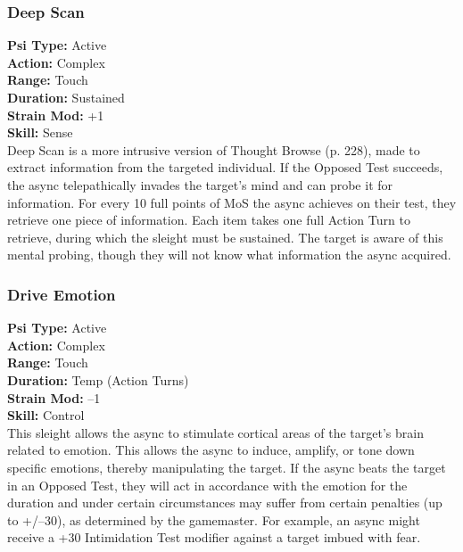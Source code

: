 \subsubsection{Deep Scan}
\textbf{Psi Type:} Active \\ 
\textbf{Action:} Complex \\ 
\textbf{Range:} Touch \\ 
\textbf{Duration:} Sustained \\
\textbf{Strain Mod:} +1 \\ 
\textbf{Skill:} Sense\\
Deep Scan is a more intrusive version of Thought
Browse (p. 228), made to extract information from the
targeted individual. If the Opposed Test succeeds, the
async telepathically invades the target’s mind and can
probe it for information. For every 10 full points of MoS
the async achieves on their test, they retrieve one piece
of information. Each item takes one full Action Turn to
retrieve, during which the sleight must be sustained. The
target is aware of this mental probing, though they will
not know what information the async acquired.

\subsubsection{Drive Emotion}
\textbf{Psi Type:} Active \\ 
\textbf{Action:} Complex \\ 
\textbf{Range:} Touch \\ 
\textbf{Duration:} Temp (Action Turns) \\
\textbf{Strain Mod:} –1 \\ 
\textbf{Skill:} Control\\
This sleight allows the async to stimulate cortical areas
of the target’s brain related to emotion. This allows
the async to induce, amplify, or tone down specific
emotions, thereby manipulating the target. If the async
beats the target in an Opposed Test, they will act in accordance
with the emotion for the duration and under
certain circumstances may suffer from certain penalties
(up to +/–30), as determined by the gamemaster. For
example, an async might receive a +30 Intimidation
Test modifier against a target imbued with fear.

